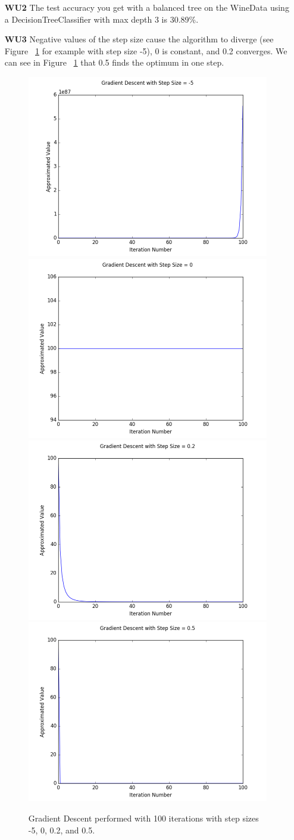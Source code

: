 \documentclass{article}
\begin{document}
\begin{enumerate}
	\item[\textbf{WU2}] The test accuracy you get with a balanced tree on the WineData using a DecisionTreeClassifier with max depth 3 is 30.89\%.
	
	\item[\textbf{WU3}] 
Negative values of the step size cause the algorithm to diverge (see Figure ~\ref{fig:WU2} for example with step size -5), 0 is constant, and 0.2 converges. We can see in Figure ~\ref{fig:WU2} that 0.5 finds the optimum in one step.
\pagebreak

\begin{figure}[htp]
\centering
\includegraphics[width=.5\textwidth]{gd_ss_neg5.png}\hfill
\includegraphics[width=.5\textwidth]{gd_ss_0.png}\hfill
\includegraphics[width=.5\textwidth]{gd_ss_point2.png}\hfill
\includegraphics[width=.5\textwidth]{gd_ss_point5.png}
\caption{Gradient Descent performed with 100 iterations with step sizes -5, 0, 0.2, and 0.5.}
\label{fig:WU2}
\end{figure}


\end{enumerate}
\end{document}
